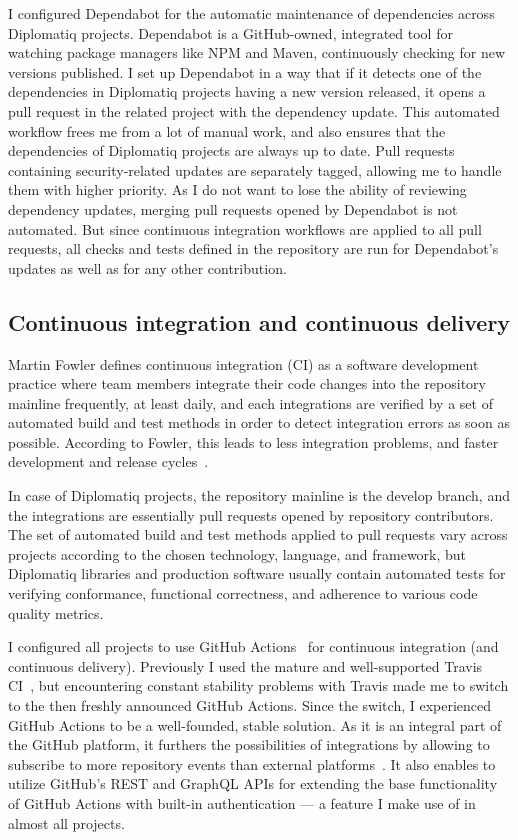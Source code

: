 I configured Dependabot for the automatic maintenance of dependencies across Diplomatiq projects. Dependabot is a GitHub-owned, integrated tool for watching package managers like NPM and Maven, continuously checking for new versions published. I set up Dependabot in a way that if it detects one of the dependencies in Diplomatiq projects having a new version released, it opens a pull request in the related project with the dependency update. This automated workflow frees me from a lot of manual work, and also ensures that the dependencies of Diplomatiq projects are always up to date. Pull requests containing security-related updates are separately tagged, allowing me to handle them with higher priority. As I do not want to lose the ability of reviewing dependency updates, merging pull requests opened by Dependabot is not automated. But since continuous integration workflows are applied to all pull requests, all checks and tests defined in the repository are run for Dependabot's updates as well as for any other contribution.

\subsection{Continuous integration and continuous delivery}

Martin Fowler defines continuous integration (CI) as a software development practice where team members integrate their code changes into the repository mainline frequently, at least daily, and each integrations are verified by a set of automated build and test methods in order to detect integration errors as soon as possible. According to Fowler, this leads to less integration problems, and faster development and release cycles~\cite{fowler-ci}.

In case of Diplomatiq projects, the repository mainline is the develop branch, and the integrations are essentially pull requests opened by repository contributors. The set of automated build and test methods applied to pull requests vary across projects according to the chosen technology, language, and framework, but Diplomatiq libraries and production software usually contain automated tests for verifying conformance, functional correctness, and adherence to various code quality metrics.

I configured all projects to use GitHub Actions~\cite{githubactions} for continuous integration (and continuous delivery). Previously I used the mature and well-supported Travis CI~\cite{travisci}, but encountering constant stability problems with Travis made me to switch to the then freshly announced GitHub Actions. Since the switch, I experienced GitHub Actions to be a well-founded, stable solution. As it is an integral part of the GitHub platform, it furthers the possibilities of integrations by allowing to subscribe to more repository events than external platforms~\cite{actions-events}. It also enables to utilize GitHub's REST and GraphQL APIs for extending the base functionality of GitHub Actions with built-in authentication — a feature I make use of in almost all projects.

